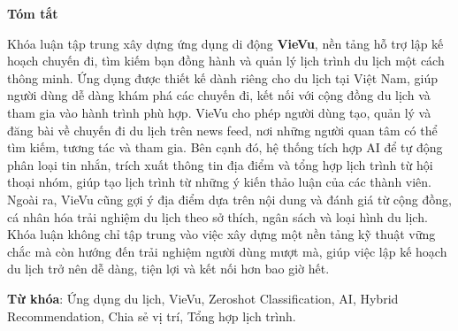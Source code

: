 \begin{center}
\textbf{\large{Tóm tắt}}
\end{center}
Khóa luận tập trung xây dựng ứng dụng di động \textbf{VieVu}, nền tảng hỗ trợ lập kế hoạch chuyến đi, tìm kiếm bạn đồng hành và quản lý lịch trình du lịch một cách thông minh. Ứng dụng được thiết kế dành riêng cho du lịch tại Việt Nam, giúp người dùng dễ dàng khám phá các chuyến đi, kết nối với cộng đồng du lịch và tham gia vào hành trình phù hợp.  
VieVu cho phép người dùng tạo, quản lý và đăng bài về chuyến đi du lịch trên news feed, nơi những người quan tâm có thể tìm kiếm, tương tác và tham gia. Bên cạnh đó, hệ thống tích hợp AI để tự động phân loại tin nhắn, trích xuất thông tin địa điểm và tổng hợp lịch trình từ hội thoại nhóm, giúp tạo lịch trình từ những ý kiến thảo luận của các thành viên.  
Ngoài ra, VieVu cũng gợi ý địa điểm dựa trên nội dung và đánh giá từ cộng đồng, cá nhân hóa trải nghiệm du lịch theo sở thích, ngân sách và loại hình du lịch.  
Khóa luận không chỉ tập trung vào việc xây dựng một nền tảng kỹ thuật vững chắc mà còn hướng đến trải nghiệm người dùng mượt mà, giúp việc lập kế hoạch du lịch trở nên dễ dàng, tiện lợi và kết nối hơn bao giờ hết.  
    
\vspace{0.5cm}
\noindent \textbf{Từ khóa}: Ứng dụng du lịch, VieVu, Zeroshot Classification, AI,  Hybrid Recommendation, Chia sẻ vị trí, Tổng hợp lịch trình.
    